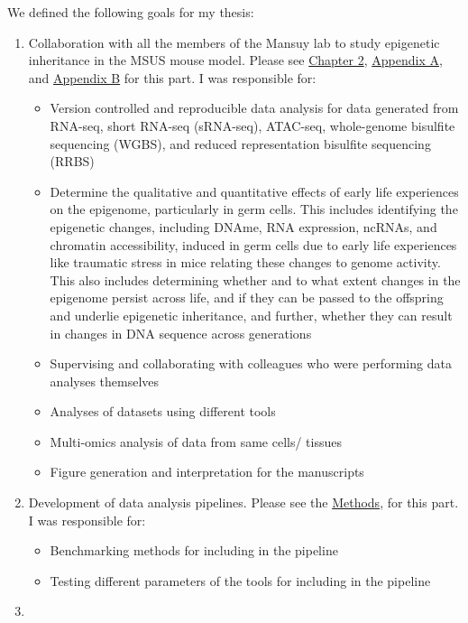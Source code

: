 \documentclass[12pt,twoside]{reedthesis}
\begin{document}
We defined the following goals for my thesis:
\begin{enumerate}
\def\labelenumi{\arabic{enumi}.}
\item
  Collaboration with all the members of the Mansuy lab to study
  epigenetic inheritance in the MSUS mouse model. Please see \protect\hyperlink{chapter2}{Chapter
  2}, \protect\hyperlink{aa}{Appendix A}, and \protect\hyperlink{ab}{Appendix B} for this
  part. I was responsible for:
  \begin{itemize}
  \item
    Version controlled and reproducible data analysis for data
    generated from RNA-seq, short RNA-seq (sRNA-seq), ATAC-seq,
    whole-genome bisulfite sequencing (WGBS), and reduced
    representation bisulfite sequencing (RRBS)
  \item
    Determine the qualitative and quantitative effects of early life
    experiences on the epigenome, particularly in germ cells. This
    includes identifying the epigenetic changes, including DNAme,
    RNA expression, ncRNAs, and chromatin accessibility, induced in
    germ cells due to early life experiences like traumatic stress
    in mice relating these changes to genome activity. This also
    includes determining whether and to what extent changes in the
    epigenome persist across life, and if they can be passed to the
    offspring and underlie epigenetic inheritance, and further,
    whether they can result in changes in DNA sequence across
    generations
  \item
    Supervising and collaborating with colleagues who were
    performing data analyses themselves
  \item
    Analyses of datasets using different tools
  \item
    Multi-omics analysis of data from same cells/ tissues
  \item
    Figure generation and interpretation for the manuscripts
  \end{itemize}
\item
  Development of data analysis pipelines. Please see the
  \protect\hyperlink{methods}{Methods}, for this part. I was responsible for:
  \begin{itemize}
  \item
    Benchmarking methods for including in the pipeline
  \item
    Testing different parameters of the tools for including in the
    pipeline
  \end{itemize}
\item

\end{enumerate}
\end{document}
